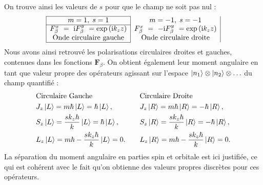 On trouve ainsi les valeurs de $s$ pour que le champ ne soit pas nul :
\[
\begin{array}{|c|c|}
		\hline
		m = 1,\;s = 1&m = -1,\;s = -1\\
		\hline
		F_{\beta}^x ~= ~\rmi F_{\beta}^y ~= \exp{(\rmi k_zz)} & F_{\beta}^x ~= ~-\rmi F_{\beta}^y ~= \exp{(\rmi k_zz)}\\
		\text{Onde circulaire gauche} & \text{Onde circulaire droite}\\
		\hline
\end{array}\]
Nous avons ainsi retrouvé les polarisations circulaires droites et gauches, contenues dans les fonctions $\bm{F}_{\beta}$. On obtient également leur moment angulaire en tant que valeur propre des opérateurs agissant sur l'espace $\ket{n_1}\otimes\ket{n_2}\otimes\ldots$ du champ quantifié :
\begin{equation}
\begin{aligned}[c]
&\text{Circulaire Gauche}\\
&J_z\ket{L} = m\hbar\ket{L} = \hbar\ket{L},\\
&S_z\ket{L} = \frac{sk_z\hbar}{k}\ket{L} = \hbar\ket{L},\\
&L_z\ket{L} = m\hbar-\frac{sk_z\hbar}{k}\ket{L} = 0.
\end{aligned}
\qquad
\begin{aligned}[c]
&\text{Circulaire Droite}\\
&J_z\ket{R} = m\hbar\ket{R} = -\hbar\ket{R},\\
&S_z\ket{R} = \frac{sk_z\hbar}{k}\ket{R} = -\hbar\ket{R},\\
&L_z\ket{R} = m\hbar-\frac{sk_z\hbar}{k}\ket{R} = 0.
\end{aligned}
\end{equation}
La séparation du moment angulaire en parties spin et orbitale est ici justifiée, ce qui est cohérent avec le fait qu'on obtienne des valeurs propres discrètes pour ces opérateurs.

